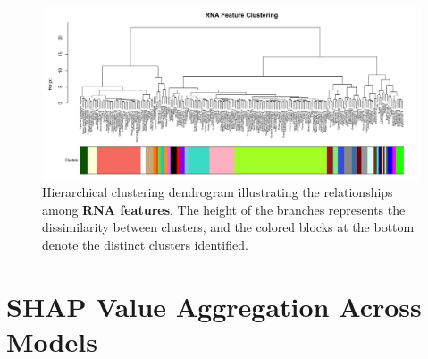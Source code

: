 \documentclass[12pt,a4paper]{report}
\begin{document}
\begin{figure}[H]
    \centering
    \includegraphics[width=1.4\linewidth, angle=270]{images/RNA_features_clustering_cut_colors.png}
    \caption[RNA features clustering dendrogram]{Hierarchical clustering dendrogram illustrating the relationships among \textbf{RNA features}. The height of the branches represents the dissimilarity between clusters, and the colored blocks at the bottom denote the distinct clusters identified.}
    \label{fig:RNA_features_clustering_cut_colors}
\end{figure}

\pagebreak

\section{SHAP Value Aggregation Across Models}
\label{appendix:shap_aggregation}
\end{document}

